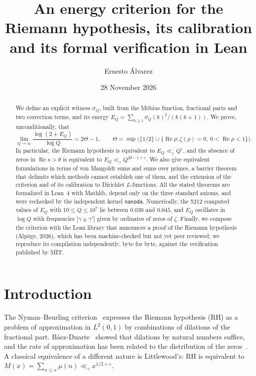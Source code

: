 \documentclass[11pt,a4paper]{amsart}
\title[An energy criterion for the Riemann hypothesis]{An energy criterion for the Riemann hypothesis, its calibration and its formal verification in Lean}
\author{Ernesto \'Alvarez}
\date{28 November 2026}
\theoremstyle{definition}
\theoremstyle{remark}
\renewcommand{\Re}{\operatorname{Re}}
\begin{document}
\begin{abstract}
We define an explicit witness $\sigma_Q$, built from the M\"obius function, fractional parts and two correction terms, and its energy $E_Q=\sum_{k\ge1}\sigma_Q(k)^2/(k(k+1))$. We prove, unconditionally, that
\[
  \lim_{Q\to\infty}\frac{\log(2+E_Q)}{\log Q}=2\Theta-1,
  \qquad \Theta=\sup\bigl(\{1/2\}\cup\{\Re\rho:\zeta(\rho)=0,\ 0<\Re\rho<1\}\bigr).
\]
In particular, the Riemann hypothesis is equivalent to $E_Q\ll_\varepsilon Q^\varepsilon$, and the absence of zeros in $\Re s>\theta$ is equivalent to $E_Q\ll_\varepsilon Q^{2\theta-1+\varepsilon}$. We also give equivalent formulations in terms of von Mangoldt sums and sums over primes, a barrier theorem that delimits which methods cannot establish one of them, and the extension of the criterion and of its calibration to Dirichlet $L$-functions. All the stated theorems are formalized in Lean~4 with Mathlib, depend only on the three standard axioms, and were rechecked by the independent kernel \texttt{nanoda}. Numerically, the 5212 computed values of $E_Q$ with $10\le Q\le10^7$ lie between $0.030$ and $0.045$, and $E_Q$ oscillates in $\log Q$ with frequencies $|\gamma\pm\gamma'|$ given by ordinates of zeros of $\zeta$. Finally, we compose the criterion with the Lean library that announces a proof of the Riemann hypothesis (Alp\"oge, 2026), which has been machine-checked but not yet peer reviewed; we reproduce its compilation independently, byte for byte, against the verification published by MIT.
\end{abstract}

\maketitle

\section{Introduction}

The Nyman--Beurling criterion~\cite{Nyman,Beurling} expresses the Riemann hypothesis (RH) as a problem of approximation in $L^2(0,1)$ by combinations of dilations of the fractional part. B\'aez-Duarte~\cite{BaezDuarte} showed that dilations by natural numbers suffice, and the rate of approximation has been related to the distribution of the zeros~\cite{BalazardSaias,Burnol,BCF}. A classical equivalence of a different nature is Littlewood's: RH is equivalent to $M(x)=\sum_{n\le x}\mu(n)\ll_\varepsilon x^{1/2+\varepsilon}$.
\end{document}
